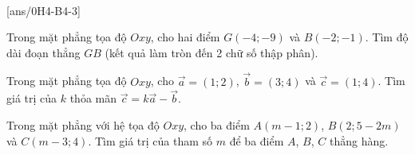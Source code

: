 
 \\
[ans/0H4-B4-3]

\begin{ex}
	Trong mặt phẳng tọa độ ${Oxy}$, cho hai điểm $G(-4;-9)$ và $B(-2;-1)$. Tìm độ dài đoạn thẳng ${GB}$ (kết quả làm tròn đến 2 chữ số thập phân).\\ 
	\end{ex}

\begin{ex}%
	Trong mặt phẳng tọa độ $Oxy$, cho $\overrightarrow{a}=(1;2)$, $\overrightarrow{b}=(3;4)$ và $\overrightarrow{c}=(1;4)$. Tìm giá trị của $k$ thỏa mãn $\overrightarrow{c}=k\overrightarrow{a}-\overrightarrow{b}$.
	\\ 
\end{ex}

\begin{ex}%
	Trong mặt phẳng với hệ tọa độ $Oxy$, cho ba điểm $A(m-1;2)$, $B(2;5-2m)$ và $C(m-3;4)$. Tìm giá trị của tham số $m$ để ba điểm $A$, $B$, $C$ thẳng hàng.\\ 
\end{ex}

